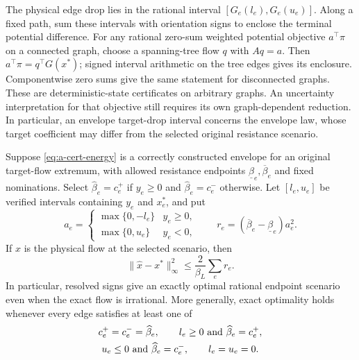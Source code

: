 The physical edge drop lies in the rational interval
$[G_e(l_e),G_e(u_e)]$. Along a fixed path, sum these intervals with
orientation signs to enclose the terminal potential difference.
For any rational zero-sum weighted potential objective $a^\top\pi$
on a connected graph, choose a spanning-tree flow $q$ with $Aq=a$.
Then $a^\top\pi=q^\top G(x^*)$; signed interval arithmetic on the
tree edges gives its enclosure. Componentwise zero sums give the same
statement for disconnected graphs. These are deterministic-state
certificates on arbitrary graphs. An uncertainty interpretation for
that objective still requires its own graph-dependent reduction.
In particular, an envelope target-drop interval concerns the envelope
law, whose target coefficient may differ from the selected original
resistance scenario.

\begin{proposition}
\label{prop:a-cert-signs}
Suppose \eqref{eq:a-cert-energy} is a correctly constructed envelope
for an original target-flow extremum, with allowed resistance endpoints
$\underline\beta_e,\overline\beta_e$ and fixed nominations.
Select $\widehat\beta_e=c_e^+$ if $y_e\ge0$ and
$\widehat\beta_e=c_e^-$ otherwise. Let $[l_e,u_e]$ be verified
intervals containing $y_e$ and $x_e^*$, and put
\[
 a_e=\begin{cases}\max\{0,-l_e\}&y_e\ge0,\\
                       \max\{0,u_e\}&y_e<0,
       \end{cases}
 \qquad r_e=(\overline\beta_e-\underline\beta_e)a_e^2.
\]
If $\widehat x$ is the physical flow at the selected scenario, then
\begin{equation}
 \|\widehat x-x^*\|_\infty^2
 \le\frac{2}{\beta_L}\sum_e r_e.
 \label{eq:a-cert-sign-error}
\end{equation}
In particular, resolved signs give an exactly optimal rational endpoint
scenario even when the exact flow is irrational. More generally, exact
optimality holds whenever every edge satisfies at least one of
\begin{equation}
 \begin{gathered}
 c_e^+=c_e^-=\widehat\beta_e,\qquad
 l_e\ge0\ \hbox{and}\ \widehat\beta_e=c_e^+,\\
 u_e\le0\ \hbox{and}\ \widehat\beta_e=c_e^-,\qquad
 l_e=u_e=0.
 \end{gathered}
 \label{eq:a-cert-compatible}
\end{equation}
\end{proposition}
